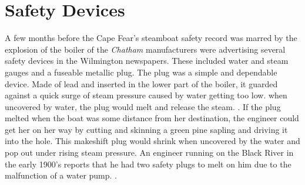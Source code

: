 \documentclass[11pt, a5paper, openright]{book}
\newcommand{\steamer}[1]{\textit{#1}\index{#1,~steamer}}
\begin{document}
\section{Safety Devices}

A few months before the Cape Fear's steamboat safety record was marred
by the explosion of the boiler of the \steamer{Chatham} manufacturers
were advertising several safety devices in the Wilmington newspapers.
These included water and steam gauges and a fuseable metallic plug.
The plug was a simple and dependable device.  Made of lead and
inserted in the lower part of the boiler, it guarded against a quick
surge of steam pressure caused by water getting too low.  when
uncovered by water, the plug would melt and release the steam.
\citep[4-29-1853]{wj}.  If the plug melted when the boat was some
distance from her destination, the engineer could get her on her way
by cutting and skinning a green pine sapling and driving it into the
hole.  This makeshift plug would shrink when uncovered by the water
and pop out under rising steam pressure.  An engineer running on the
Black River in the early 1900's reports that he had two safety plugs
to melt on him due to the malfunction of a water pump.
\citep{johnsonlg}.\par
\end{document}
